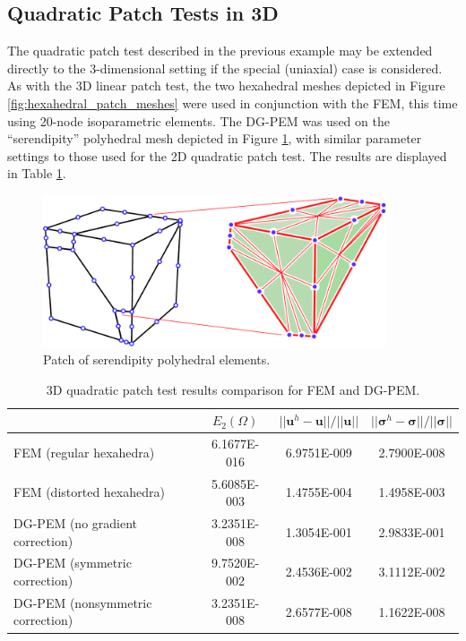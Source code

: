 \subsection*{Quadratic Patch Tests in 3D}

The quadratic patch test described in the previous example may be extended directly to the 3-dimensional setting if the special (uniaxial) case is considered. As with the 3D linear patch test, the two hexahedral meshes depicted in Figure \ref{fig:hexahedral_patch_meshes} were used in conjunction with the FEM, this time using 20-node isoparametric elements. The DG-PEM was used on the ``serendipity'' polyhedral mesh depicted in Figure \ref{fig:quadratic_polyhedral_patch_mesh}, with similar parameter settings to those used for the 2D quadratic patch test. The results are displayed in Table \ref{tab:quadratic_patch_test_3d}.

\begin{figure}[!h]
    \centering
    \includegraphics[width=4.0in]{figures/quadratic_polyhedral_patch_mesh.pdf}
    	\caption{Patch of serendipity polyhedral elements.}
    \label{fig:quadratic_polyhedral_patch_mesh}
\end{figure}

\begin{table}[!ht]
  \begin{center}
    \begin{tabular}{| l || c | c | c |}
    \hline
           & $E_2 (\Omega)$ & $||\mathbf{u}^h - \mathbf{u}|| / ||\mathbf{u}||$ & $||\boldsymbol{\sigma}^h - \boldsymbol{\sigma}|| / ||\boldsymbol{\sigma}||$ \\ \hline \hline
    FEM (regular hexahedra) & 6.1677E-016 & 6.9751E-009 & 2.7900E-008 \\ \hline
    FEM (distorted hexahedra) & 5.6085E-003 & 1.4755E-004 & 1.4958E-003 \\ \hline
    DG-PEM (no gradient correction) & 3.2351E-008 & 1.3054E-001 & 2.9833E-001 \\ \hline
    DG-PEM (symmetric correction) & 9.7520E-002 & 2.4536E-002 & 3.1112E-002 \\ \hline
    DG-PEM (nonsymmetric correction) & 3.2351E-008 & 2.6577E-008 & 1.1622E-008 \\
    \hline
    \end{tabular}
    \caption{3D quadratic patch test results comparison for FEM and DG-PEM.}
    \vspace{-5pt}
    \label{tab:quadratic_patch_test_3d}
    \vspace{-10pt}
  \end{center}
\end{table}

